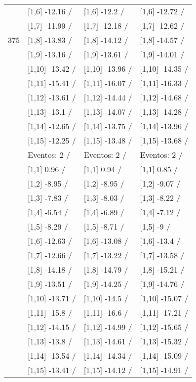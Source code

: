 \begin{table}
\begin{tabular}[t]{llll}
 & {}[1,6] -12.16  / & {}[1,6] -12.2  / & {}[1,6] -12.72  /\\
 & {}[1,7] -11.99  / & {}[1,7] -12.18  / & {}[1,7] -12.62  /\\
375 & {}[1,8] -13.83  / & {}[1,8] -14.12  / & {}[1,8] -14.57  /\\
\addlinespace
 & {}[1,9] -13.16  / & {}[1,9] -13.61  / & {}[1,9] -14.01  /\\
 & {}[1,10] -13.42  / & {}[1,10] -13.96  / & {}[1,10] -14.35  /\\
 & {}[1,11] -15.41  / & {}[1,11] -16.07  / & {}[1,11] -16.33  /\\
 & {}[1,12] -13.61  / & {}[1,12] -14.44  / & {}[1,12] -14.68  /\\
 & {}[1,13] -13.1  / & {}[1,13] -14.07  / & {}[1,13] -14.28  /\\
\addlinespace
 & {}[1,14] -12.65  / & {}[1,14] -13.75  / & {}[1,14] -13.96  /\\
 & {}[1,15] -12.25  / & {}[1,15] -13.48  / & {}[1,15] -13.68  /\\
 & Eventos:  2 / & Eventos:  2 / & Eventos:  2 /\\
 & {}[1,1] 0.96  / & {}[1,1] 0.94  / & {}[1,1] 0.85  /\\
 & {}[1,2] -8.95  / & {}[1,2] -8.95  / & {}[1,2] -9.07  /\\
\addlinespace
 & {}[1,3] -7.83  / & {}[1,3] -8.03  / & {}[1,3] -8.22  /\\
 & {}[1,4] -6.54  / & {}[1,4] -6.89  / & {}[1,4] -7.12  /\\
 & {}[1,5] -8.29  / & {}[1,5] -8.71  / & {}[1,5] -9  /\\
 & {}[1,6] -12.63  / & {}[1,6] -13.08  / & {}[1,6] -13.4  /\\
 & {}[1,7] -12.66  / & {}[1,7] -13.22  / & {}[1,7] -13.58  /\\
\addlinespace
500 & {}[1,8] -14.18  / & {}[1,8] -14.79  / & {}[1,8] -15.21  /\\
 & {}[1,9] -13.51  / & {}[1,9] -14.25  / & {}[1,9] -14.76  /\\
 & {}[1,10] -13.71  / & {}[1,10] -14.5  / & {}[1,10] -15.07  /\\
 & {}[1,11] -15.8  / & {}[1,11] -16.6  / & {}[1,11] -17.21  /\\
 & {}[1,12] -14.15  / & {}[1,12] -14.99  / & {}[1,12] -15.65  /\\
\addlinespace
 & {}[1,13] -13.8  / & {}[1,13] -14.61  / & {}[1,13] -15.32  /\\
 & {}[1,14] -13.54  / & {}[1,14] -14.34  / & {}[1,14] -15.09  /\\
 & {}[1,15] -13.41  / & {}[1,15] -14.12  / & {}[1,15] -14.91  /\\
\bottomrule
\end{tabular}
\end{table}
